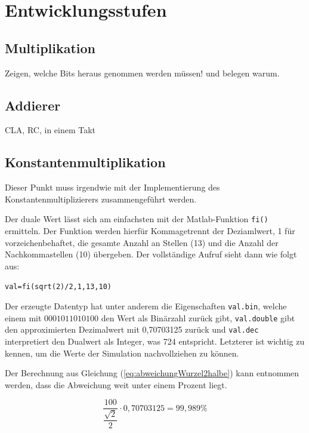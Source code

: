 \section{Entwicklungsstufen}
\subsection{Multiplikation}

Zeigen, welche Bits heraus genommen werden müssen! und belegen warum.

\subsection{Addierer}
CLA, RC, in einem Takt

\subsection{Konstantenmultiplikation}
Dieser Punkt muss irgendwie mit der Implementierung des Konstantenmultiplizierers zusammengeführt werden.

Der duale Wert lässt sich am einfachsten mit der Matlab-Funktion \texttt{fi()} ermitteln. Der Funktion werden hierfür Kommagetrennt der Deziamlwert, 1 für vorzeichenbehaftet,
die gesamte Anzahl an Stellen (13) und die Anzahl der Nachkommastellen (10) übergeben. Der vollständige Aufruf sieht dann wie folgt aus:

\texttt{val=fi(sqrt(2)/2,1,13,10)}

Der erzeugte Datentyp hat unter anderem die Eigenschaften \texttt{val.bin}, welche einem mit $0001011010100$ den Wert als Binärzahl zurück gibt, 
\texttt{val.double} gibt den approximierten Dezimalwert mit 0,70703125 zurück und \texttt{val.dec} interpretiert den Dualwert als Integer, was 724 entspricht.
Letzterer ist wichtig zu kennen, um die Werte der Simulation nachvollziehen zu können.

Der Berechnung aus Gleichung (\ref{eq:abweichungWurzel2halbe}) kann entnommen werden, dass die Abweichung weit unter einem Prozent liegt.

\begin{equation}\label{eq:abweichungWurzel2halbe}
 \frac{100}{\dfrac{\sqrt{2}}{2}}\cdot 0,70703125 = 99,989\%
\end{equation}



